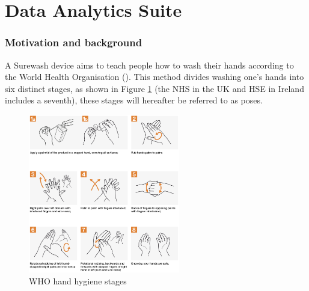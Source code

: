 \part{Data Analytics Suite}
\section{Motivation and background}
A Surewash device aims to teach people how to wash their hands according to the World Health Organisation (\cite{who_handhygiene}). This method divides washing one's hands into six distinct stages, as shown in Figure \ref{fig:who_poses} (the NHS in the UK and HSE in Ireland includes a seventh), these stages will hereafter be referred to as poses.
\begin{figure}[h]
    \centering
    \includegraphics[width=250px]{../img/who_poses.png}
    \caption[]{WHO hand hygiene stages\footnotemark}
    \label{fig:who_poses}
\end{figure}


